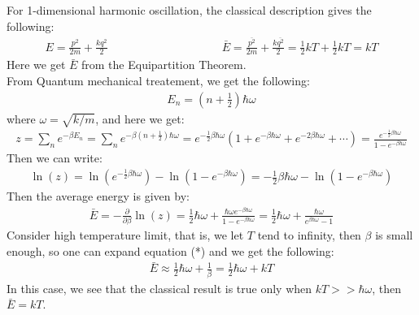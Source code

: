 \documentclass[11pt,oneside]{book}
\theoremstyle{break}
\theoremstyle{break}
\begin{document}
For 1-dimensional harmonic oscillation, the classical description gives the following:
\begin{align*}
E = \frac{p^2}{2m}+ \frac{kq^2}{2}\qquad\qquad\qquad\qquad\qquad \bar{E} = {\frac{\overline{p^2}}{2m}}+	{\frac{k\overline{q^2}}{2}} = \frac{1}{2}kT + \frac{1}{2}kT = kT
\end{align*}
Here we get $\bar{E}$ from the Equipartition Theorem. \\
From Quantum mechanical treatement, we get the following:
\begin{align*}
E_n = \left( n+\frac{1}{2}\right) \hbar \omega
\end{align*}
where $\omega = \sqrt{k/m}$, and here we get:
\begin{align*}
z = \sum_n e^{-\beta E_n} = \sum_n e^{-\beta\left( n+\frac{1}{2}\right) \hbar \omega} = e^{-\frac{1}{2}\beta \hbar \omega} \left( 1+ e^{-\beta \hbar \omega}+ e^{-2\beta \hbar \omega}+\cdots \right) = \frac{e^{-\frac{1}{2}\beta \hbar \omega}}{1-e^{-\beta \hbar \omega}}
\end{align*}
Then we can write:
\begin{align*}
\ln(z) = \ln\left( e^{-\frac{1}{2}\beta \hbar \omega}\right) - \ln\left( 1- e^{-\beta \hbar \omega}\right) = -\frac{1}{2}\beta \hbar \omega - \ln\left( 1-e^{-\beta \hbar \omega}\right)
\end{align*}
Then the average energy is given by:
\begin{align*}
\bar{E} = -\frac{\partial}{\partial \beta}\ln(z) = \frac{1}{2}\hbar  \omega + \frac{\hbar \omega e^{-\beta \hbar \omega}}{1-e^{-\beta \hbar \omega}} = \frac{1}{2}\hbar \omega + \frac{\hbar\omega}{e^{\beta \hbar \omega}-1} \tag{*}
\end{align*}
Consider high temperature limit, that is, we let $T$ tend to infinity, then $\beta$ is small enough, so one can expand equation (*) and we get the following:
\begin{align*}
\bar{E} \approx \frac{1}{2}\hbar \omega+\frac{1}{\beta} = \frac{1}{2}\hbar \omega +kT
\end{align*}
In this case, we see that the classical result is true only when $kT >> \hbar\omega$, then $\bar{E} = kT$. 



\newpage
\end{document}
